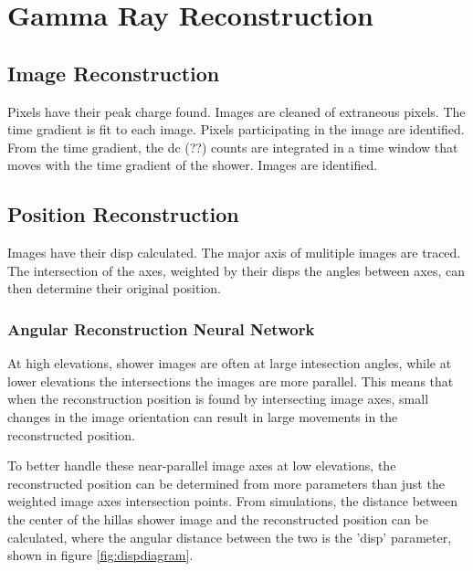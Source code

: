 \cleartooddpage[\thispagestyle{empty}]
\chapter{Gamma Ray Reconstruction}



\section{Image Reconstruction}\label{subsec:imgrecon}

Pixels have their peak charge found.
Images are cleaned of extraneous pixels.
The time gradient is fit to each image.
Pixels participating in the image are identified.
From the time gradient, the dc (??) counts are integrated in a time window that moves with the time gradient of the shower.
Images are identified.

\section{Position Reconstruction}\label{subsec:posrecon}
Images have their disp calculated.
The major axis of mulitiple images are traced.
The intersection of the axes, weighted by their disps the angles between axes, can then determine their original position.

\subsection{Angular Reconstruction Neural Network}
At high elevations, shower images are often at large intesection angles, while at lower elevations the intersections the images are more parallel.
This means that when the reconstruction position is found by intersecting image axes, small changes in the image orientation can result in large movements in the reconstructed position.

To better handle these near-parallel image axes at low elevations, the reconstructed position can be determined from more parameters than just the weighted image axes intersection points.
From simulations, the distance between the center of the hillas shower image and the reconstructed position can be calculated, where the angular distance between the two is the 'disp' parameter\cite{Senturk:2011}, shown in figure \ref{fig:dispdiagram}.

